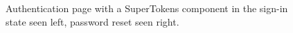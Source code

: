 \begin{figure}
    \centering
    \hfill
    \caption[Authentication page]{Authentication page with a SuperTokens component in the sign-in state seen left, password reset seen right.}
    \label{fig:auth_page}
\end{figure}

